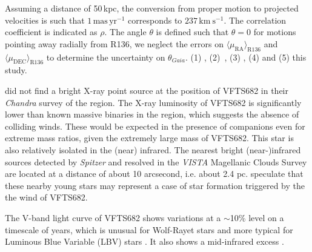 \documentclass[a4paper,fleqn,usenatbib]{mnras}
\newcommand{\kms}{{\,\mathrm{km\ s^{-1}}}}
\newcommand{\masyr}{\,\mathrm{mas}\,\mathrm{yr}^{-1}}
\DeclareRobustCommand{\Secref}[1]{Sec.~\ref{#1}}
\begin{document}
\begin{table}
\begin{center}
\begin{tabular}{llc|c|c}
     



    \end{tabular}
    
    Assuming a distance of 50\,kpc, the conversion from proper motion
    to projected velocities is such that $1\masyr$ corresponds to $237\kms$.  The
      correlation coefficient is indicated as $\rho$. The angle
      $\theta$ is defined such that $\theta=0$ for motions pointing
      away radially from R136, we neglect the errors on
      $\langle\mu_\mathrm{RA}\rangle_\mathrm{R136}$ and $\langle\mu_\mathrm{DEC}\rangle_\mathrm{R136}$ to determine the uncertainty
      on $\theta_{Gaia}$.
      (1) \cite{brown:18},
      (2)~\cite{bestenlehner:11},
      (3) \cite{lennon:18}, 
      (4) \cite{platais:18} and
      (5) {\color{blue}this study}.
  \end{center}
  \label{tab:vfts682}
\end{table}

\cite{townsley:06} did not find
a bright X-ray point source at the position of VFTS682 in their
\emph{Chandra} survey of the region. The X-ray luminosity of VFTS682
is significantly lower than known massive binaries in the region, which suggests the absence of
colliding winds. These would be expected in the presence of companions
even for extreme mass ratios, given the extremely large mass of
VFTS682. This star is also relatively isolated in the (near)
infrared. The nearest bright (near-)infrared sources detected by
\emph{Spitzer} \citep{meixner:06} and resolved in the \emph{VISTA}
Magellanic Clouds Survey \citep{cioni:11} are located at a distance of
about 10 arcsecond, i.e. about 2.4 pc. \cite{walborn:13} speculate
that these nearby young stars may represent a case of star formation triggered by the the wind of VFTS682.

The V-band light curve of VFTS682  shows
variations at a $\sim$10\% level on a timescale of years, which is
unusual for Wolf-Rayet stars and more typical for Luminous Blue
Variable (LBV) stars \citep{parker:93, udalski:08, bestenlehner:11}. It also
shows a mid-infrared excess \citep{gruendl:09}.
\end{document}
